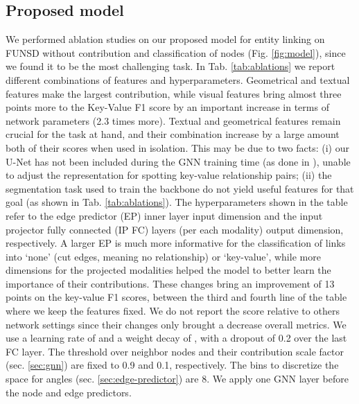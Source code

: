 \documentclass[runningheads]{llncs}
\begin{document}
\subsection{Proposed model}
We performed ablation studies on our proposed model for entity linking on FUNSD without contribution and classification of nodes (Fig. \ref{fig:model}), since we found it to be the most challenging task. In Tab. \ref{tab:ablations} we report different combinations of features and hyperparameters. Geometrical and textual features make the largest contribution, while visual features bring almost three points more to the Key-Value F1 score by an important increase in terms of network parameters (2.3 times more). Textual and geometrical features remain crucial for the task at hand, and their combination increase by a large amount both of their scores when used in isolation. This may be due to two facts: (i) our U-Net has not been included during the GNN training time (as done in \cite{davis2021visual}), unable to adjust the representation for spotting key-value relationship pairs; (ii) the segmentation task used to train the backbone do not yield useful features for that goal (as shown in Tab. \ref{tab:ablations}).
The hyperparameters shown in the table refer to the edge predictor (EP) inner layer input dimension and the input projector fully connected (IP FC) layers (per each modality) output dimension, respectively. A larger EP is much more informative for the classification of links into `none' (cut edges, meaning no relationship) or `key-value', while more dimensions for the projected modalities helped the model to better learn the importance of their contributions. These changes bring an improvement of 13 points on the key-value F1 scores, between the third and fourth line of the table where we keep the features fixed. We do not report the score relative to others network settings since their changes only brought a decrease overall metrics. We use a learning rate of  and a weight decay of , with a dropout of 0.2 over the last FC layer. The threshold over neighbor nodes and their contribution scale factor (sec. \ref{sec:gnn}) are fixed to 0.9 and 0.1, respectively. The bins to discretize the space for angles (sec. \ref{sec:edge-predictor}) are 8. We apply one GNN layer before the node and edge predictors.
\end{document}
